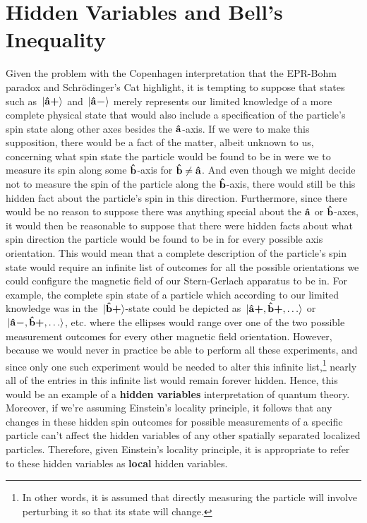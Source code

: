 \section{Hidden Variables and Bell's Inequality\label{hiddenbellsection}}
Given the problem with the Copenhagen interpretation that the EPR-Bohm paradox and Schr\"{o}dinger's Cat highlight, it is tempting to suppose that states such as $\ket*{\vb{\hat{{a}}}\bm{+}}$ and $\ket*{\vb{\hat{{a}}}\bm{-}}$ merely represents our limited knowledge of a more complete physical state that would also include a specification of the particle's spin state along other axes besides the $\vb{\hat{{a}}}$-axis. If we were to make this supposition, there would be a fact of the matter, albeit unknown to us, concerning what spin state the particle would be found to be in  were we to measure its spin along some $\vb{\hat{{b}}}$-axis for $\vb{\hat{{b}}}\neq\vb{\hat{{a}}}$. And  even though we might decide not to measure the spin of the particle along the $\vb{\hat{{b}}}$-axis, there would still be this hidden fact about the particle's spin in this direction. Furthermore, since there would be no reason to suppose there was anything special about the $\vb{\hat{{a}}}$ or $\vb{\hat{{b}}}$-axes, it would then be reasonable to suppose that there were hidden facts about what spin direction the particle would be found to be in for every possible axis orientation. This would mean that a complete description of the particle's spin state would require an infinite list of outcomes for all the possible orientations we could configure the magnetic field of our Stern-Gerlach apparatus to be in. For example, the complete spin state of a particle which according to our limited knowledge was in the $\ket*{\vb{\hat{{b}}}\bm{+}}$-state could be depicted as $\ket*{\vb{\hat{{a}}}\bm{+},\vb{\hat{{b}}}\bm{+},\ldots}$ or  $\ket*{\vb{\hat{{a}}}\bm{-},\vb{\hat{{b}}}\bm{+},\ldots}$, etc. where the ellipses would range over one of the two possible measurement outcomes for every other magnetic field orientation. However, because we would never in practice be able to perform all these experiments, and since only one such experiment would be needed to alter this infinite list,\footnote{In other words, it is assumed that directly measuring the particle will involve perturbing it so that its state will change.} nearly all of the entries in this infinite list would remain forever hidden. Hence, this would be an example of a \textbf{hidden variables} interpretation of quantum theory.  Moreover, if we're assuming Einstein's locality principle, it follows that any changes in these hidden spin outcomes for possible measurements of a specific particle can't affect the hidden variables of any other spatially separated localized particles. Therefore, given Einstein's locality principle, it is appropriate to refer to these hidden variables as \textbf{local} hidden variables.

